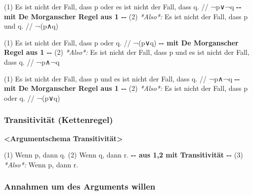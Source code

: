 \documentclass[
  english,
  a4paper,
]{article}
\newenvironment{Shaded}{\begin{snugshade}}{\end{snugshade}}
\newcommand{\AlertTok}[1]{\textcolor[rgb]{0.02,0.51,0.79}{\textbf{#1}}}
\newcommand{\CommentTok}[1]{\textcolor[rgb]{0.54,0.53,0.53}{#1}}
\newcommand{\ErrorTok}[1]{\textcolor[rgb]{0.02,0.51,0.79}{#1}}
\newcommand{\FloatTok}[1]{\textcolor[rgb]{0.12,0.11,0.11}{\textit{#1}}}
\newcommand{\NormalTok}[1]{\textcolor[rgb]{0.12,0.11,0.11}{#1}}
\newcommand{\WarningTok}[1]{\textcolor[rgb]{0.46,0.73,0.89}{\textbf{#1}}}
\renewenvironment{Shaded}{\centering \begin{mdframed}[style=codedefault]}{\end{mdframed}}%
\newenvironment{Shaded}{\centering \begin{mdframed}[style=codedefault]}{\end{mdframed}}%
\begin{document}
\begin{Shaded}
\begin{Highlighting}[]
\ErrorTok{(1)}\NormalTok{ Es ist nicht der Fall, dass p oder es ist nicht der Fall, dass q.}
  \CommentTok{// ¬p∨¬q}
\WarningTok{{-}{-} mit De Morgan\textquotesingle{}scher Regel aus 1 {-}{-}}
\ErrorTok{(2)}\FloatTok{ *Also*:}\NormalTok{ Es ist nicht der Fall, dass p und q.}
  \CommentTok{// ¬(p∧q)}
\end{Highlighting}
\end{Shaded}

\begin{Shaded}
\begin{Highlighting}[]
\ErrorTok{(1)}\NormalTok{ Es ist nicht der Fall, dass p oder q.}
  \CommentTok{// ¬(p∨q)}
\WarningTok{{-}{-} mit De Morgan\textquotesingle{}scher Regel aus 1 {-}{-}}
\ErrorTok{(2)}\FloatTok{ *Also*:}\NormalTok{ Es ist nicht der Fall, dass p und es ist nicht der Fall, dass q.}
  \CommentTok{// ¬p∧¬q}
\end{Highlighting}
\end{Shaded}

\begin{Shaded}
\begin{Highlighting}[]
\ErrorTok{(1)}\NormalTok{ Es ist nicht der Fall, dass p und es ist nicht der Fall, dass q.}
  \CommentTok{// ¬p∧¬q}
\WarningTok{{-}{-} mit De Morgan\textquotesingle{}scher Regel aus 1 {-}{-}}
\ErrorTok{(2)}\FloatTok{ *Also*:}\NormalTok{ Es ist nicht der Fall, dass p oder q.}
  \CommentTok{// ¬(p∨q)}
\end{Highlighting}
\end{Shaded}

\subsubsection{Transitivität
(Kettenregel)}\label{transitivituxe4t-kettenregel}

\begin{Shaded}
\begin{Highlighting}[]
\AlertTok{\textless{}Argumentschema Transitivität\textgreater{}}

\ErrorTok{(1)}\NormalTok{ Wenn p, dann q.}
\ErrorTok{(2)}\NormalTok{ Wenn q, dann r.}
\WarningTok{{-}{-} aus 1,2 mit Transitivität {-}{-}}
\ErrorTok{(3)}\FloatTok{ *Also*:}\NormalTok{ Wenn p, dann r.}
\end{Highlighting}
\end{Shaded}

\subsubsection{Annahmen um des Arguments
willen}\label{annahmen-um-des-arguments-willen}
\end{document}
